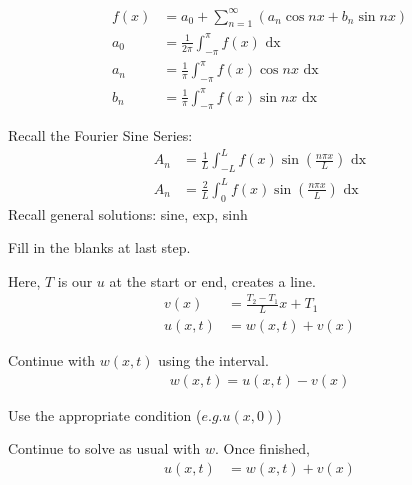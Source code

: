 \documentclass{article}
\begin{document}
\begin{multicols}{2}
  \begin{align*}
    f(x) & =
    a_0 +
    \sum^\infty_{n = 1}
    (a_n \cos nx + b_n \sin nx)\\
    a_0 & =
    \frac{1}{2 \pi}
    \int^\pi_{-\pi}
    f(x)
    \text{ dx}\\
    a_n & =
    \frac{1}{\pi}
    \int^\pi_{-\pi}
    f(x) \cos nx
    \text{ dx}\\
    b_n & =
    \frac{1}{\pi}
    \int^\pi_{-\pi}
    f(x) \sin nx
    \text{ dx}
  \end{align*}

Recall the Fourier Sine Series:
\begin{align*}
  A_n & = \frac{1}{L}\int^L_{-L} f(x) \sin\left(\frac{n \pi x}{L}\right)\text{ dx}\\
  A_n & = \frac{2}{L}\int^L_0 f(x) \sin\left(\frac{n \pi x}{L}\right)\text{ dx}
\end{align*}
Recall general solutions: sine, exp, sinh

Fill in the blanks at last step.


Here, $T$ is our $u$ at the start or end, creates a line.
\begin{align*}
  v(x) & = \frac{T_2 - T_1}{L}x + T_1\\
  u(x, t) & = w(x, t) + v(x)
\end{align*}

Continue with $w(x, t)$ using the interval.
\begin{align*}
  w(x, t) = u(x, t) - v(x)
\end{align*}

Use the appropriate condition ($e.g. u(x, 0)$)

Continue to solve as usual with $w$. Once finished,
\begin{align*}
  u(x, t) & = w(x, t) + v(x)
\end{align*}
\end{multicols}
\end{document}
